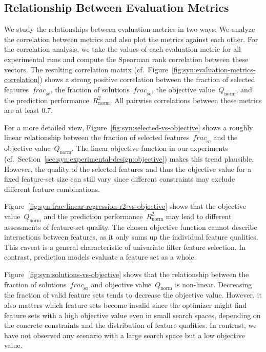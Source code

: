 \subsection{Relationship Between Evaluation Metrics}
\label{sec:syn:evaluation:metrics}

We study the relationships between evaluation metrics in two ways:
We analyze the correlation between metrics and also plot the metrics against each other.
For the correlation analysis, we take the values of each evaluation metric for all experimental runs and compute the Spearman rank correlation between these vectors.
The resulting correlation matrix (cf.~Figure~\ref{fig:syn:evaluation-metrics-correlation}) shows a strong positive correlation between the fraction of selected features~$\mathit{frac}_{\text{se}}$, the fraction of solutions~$\mathit{frac}_{\text{so}}$, the objective value~$Q_{\text{norm}}$, and the prediction performance~$R^{2}_{\text{norm}}$.
All pairwise correlations between these metrics are at least 0.7.

For a more detailed view, Figure~\ref{fig:syn:selected-vs-objective} shows a roughly linear relationship between the fraction of selected features~$\mathit{frac}_{\text{se}}$ and the objective value~$Q_{\text{norm}}$.
The linear objective function in our experiments (cf.~Section~\ref{sec:syn:experimental-design:objective}) makes this trend plausible.
However, the quality of the selected features and thus the objective value for a fixed feature-set size can still vary since different constraints may exclude different feature combinations.

Figure~\ref{fig:syn:frac-linear-regression-r2-vs-objective} shows that the objective value~$Q_{\text{norm}}$ and the prediction performance~$R^{2}_{\text{norm}}$ may lead to different assessments of feature-set quality.
The chosen objective function cannot describe interactions between features, as it only sums up the individual feature qualities.
This caveat is a general characteristic of univariate filter feature selection.
In contrast, prediction models evaluate a feature set as a whole.

Figure~\ref{fig:syn:solutions-vs-objective} shows that the relationship between the fraction of solutions~$\mathit{frac}_{\text{so}}$ and objective value~$Q_{\text{norm}}$ is non-linear.
Decreasing the fraction of valid feature sets tends to decrease the objective value.
However, it also matters which feature sets become invalid since the optimizer might find feature sets with a high objective value even in small search spaces, depending on the concrete constraints and the distribution of feature qualities.
In contrast, we have not observed any scenario with a large search space but a low objective value.

